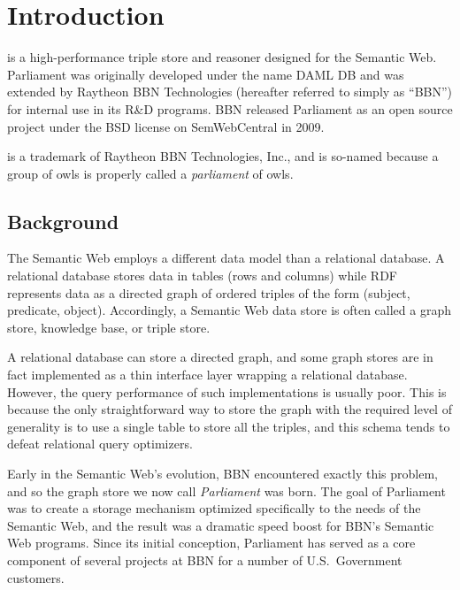 
\chapter{Introduction}

\pmnt{} is a high-performance triple store and reasoner designed for the Semantic Web.  Parliament was originally developed under the name DAML DB and was extended by Raytheon BBN Technologies (hereafter referred to simply as ``BBN'') for internal use in its R\&D programs.  BBN released Parliament as an open source project under the BSD license on SemWebCentral in 2009.

\pmnt{} is a trademark of Raytheon BBN Technologies, Inc., and is so-named because a group of owls is properly called a \emph{parliament} of owls.

\section{Background}

The Semantic Web employs a different data model than a relational database.  A relational database stores data in tables (rows and columns) while RDF represents data as a directed graph of ordered triples of the form (subject, predicate, object).  Accordingly, a Semantic Web data store is often called a graph store, knowledge base, or triple store.

A relational database can store a directed graph, and some graph stores are in fact implemented as a thin interface layer wrapping a relational database.  However, the query performance of such implementations is usually poor.  This is because the only straightforward way to store the graph with the required level of generality is to use a single table to store all the triples, and this schema tends to defeat relational query optimizers.

Early in the Semantic Web's evolution, BBN encountered exactly this problem, and so the graph store we now call \emph{Parliament} was born.  The goal of Parliament was to create a storage mechanism optimized specifically to the needs of the Semantic Web, and the result was a dramatic speed boost for BBN's Semantic Web programs.  Since its initial conception, Parliament has served as a core component of several projects at BBN for a number of U.S.\ Government customers.

